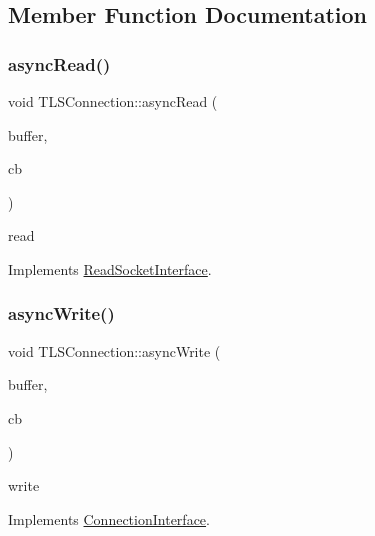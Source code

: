 \subsection{Member Function Documentation}
\mbox{\label{class_t_l_s_connection_a37ef49d562cad83c9cdb130f7196f0b5}} 
\subsubsection{\texorpdfstring{async\+Read()}{asyncRead()}}
{\footnotesize\ttfamily void T\+L\+S\+Connection\+::async\+Read (\begin{DoxyParamCaption}\item[{\hyperlink{struct_m_buffer}{M\+Buffer} \&}]{buffer,  }\item[{Async\+Read\+Callback\+Type}]{cb }\end{DoxyParamCaption})\hspace{0.3cm}{\ttfamily [virtual]}}

read 

Implements \hyperlink{class_read_socket_interface}{Read\+Socket\+Interface}.

\mbox{\label{class_t_l_s_connection_abcca8739e56387ddceeefd15f8ea0967}} 
\subsubsection{\texorpdfstring{async\+Write()}{asyncWrite()}\hspace{0.1cm}{\footnotesize\ttfamily [1/2]}}
{\footnotesize\ttfamily void T\+L\+S\+Connection\+::async\+Write (\begin{DoxyParamCaption}\item[{\hyperlink{struct_m_buffer}{M\+Buffer} \&}]{buffer,  }\item[{Async\+Write\+Callback\+Type}]{cb }\end{DoxyParamCaption})\hspace{0.3cm}{\ttfamily [virtual]}}

write 

Implements \hyperlink{class_connection_interface}{Connection\+Interface}.

